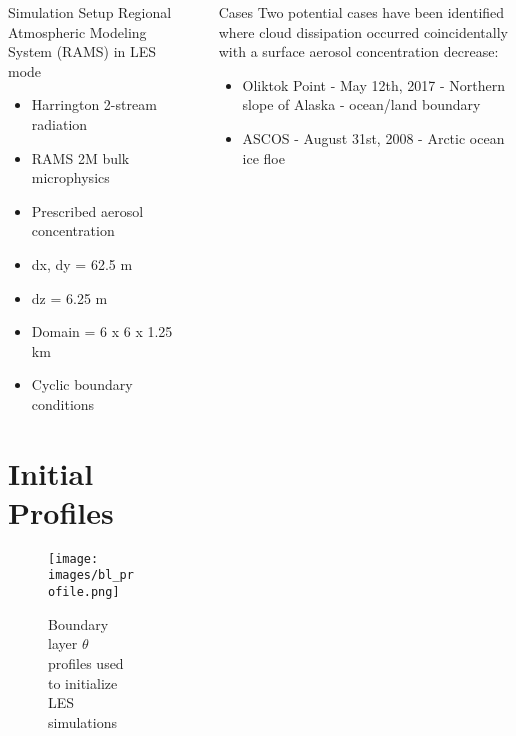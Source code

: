 \documentclass[final]{beamer}
\newlength{\sepwid}
\newlength{\onecolwid}
\newlength{\twocolwid}
\begin{document}
\begin{frame}[t]
\begin{columns}[t]
\begin{column}{\onecolwid}
	\begin{block}{Simulation Setup}
		Regional Atmospheric Modeling System (RAMS) in LES mode
		\begin{itemize}
			\item Harrington 2-stream radiation
			\item RAMS 2M bulk microphysics
			\item Prescribed aerosol concentration
			\item dx, dy = 62.5 m
			\item dz = 6.25 m
			\item Domain = 6 x 6 x 1.25 km
			\item Cyclic boundary conditions
		\end{itemize}
		\section{Initial Profiles}
		\begin{figure}
			\centering
			\texttt{[image: images/bl\_profile.png]}
			\caption{Boundary layer $\theta$ profiles used to initialize LES simulations}
		\end{figure}
	\end{block}

\end{column} %

\begin{column}{\sepwid}\end{column} %

\begin{column}{\twocolwid}
	\begin{block}{Cases}
			Two potential cases have been identified where cloud dissipation occurred coincidentally with a surface aerosol concentration decrease:
			\begin{itemize}
				\item Oliktok Point - May 12th, 2017 - Northern slope of Alaska - ocean/land boundary
				\item ASCOS - August 31st, 2008 - Arctic ocean ice floe
			\end{itemize}
			

\end{block}
\end{column}
\end{columns}
\end{frame}
\end{document}
